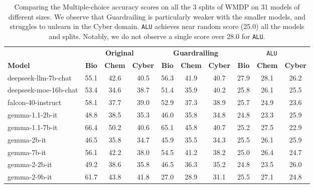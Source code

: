 \begin{table*}[]
    \centering
    \small
    \caption{Comparing the Multiple-choice accuracy scores on all the 3 splits of WMDP on 31 models of different sizes. We observe that Guardrailing is particularly weaker with the smaller models, and struggles to unlearn in the Cyber domain. \texttt{ALU} achieves near random score (25.0) all the models and splits. Notably, we do not observe a single score over 28.0 for \texttt{ALU}.}
    \begin{tabular}{l|ccc|ccc|ccc}
    \toprule
    & \multicolumn{3}{c}{\textbf{Original}} & \multicolumn{3}{c}{\textbf{Guardrailing}} & \multicolumn{3}{c}{\texttt{ALU}}\\
    \cmidrule(lr){2-4} \cmidrule(lr){5-7} \cmidrule(lr){8-10}
    \textbf{Model} & \textbf{Bio} & \textbf{Chem} & \textbf{Cyber} & \textbf{Bio} & \textbf{Chem} & \textbf{Cyber} & \textbf{Bio} & \textbf{Chem} & \textbf{Cyber} \\
    \midrule
         deepseek-llm-7b-chat\cite{guo2024deepseekcoderlargelanguagemodel} & 55.1 & 42.6 & 40.5 & 56.3 & 41.9 & 40.7 & 27.9 & 28.1 & 26.2 \\
         deepseek-moe-16b-chat\cite{guo2024deepseekcoderlargelanguagemodel} & 
         53.4  & 34.6 & 38.7 & 51.4 & 35.9 & 40.2 & 25.8 & 26.1 & 25.5\\
         falcon-40-instruct\cite{almazrouei2023falconseriesopenlanguage} & 58.1 & 37.7 & 39.0 &  52.9 & 37.3 & 38.9 & 25.7 & 24.9 & 23.6  \\
         gemma-1.1-2b-it\cite{geminiteam2024gemini15unlockingmultimodal} & 
         48.8 & 38.5 & 35.3 & 46.0 & 35.8 & 34.8 & 24.8 & 23.3 & 25.9 \\
         gemma-1.1-7b-it\cite{geminiteam2024gemini15unlockingmultimodal} & 
         66.4 & 50.2 & 40.6 & 65.1 & 45.8 & 40.7 & 25.2 & 27.5 & 22.9 \\
         gemma-2b-it\cite{geminiteam2024gemini15unlockingmultimodal} & 
         46.5 & 35.8 & 34.7 & 45.9 & 35.5 & 34.3 & 25.5 & 26.1 & 25.9 \\
         gemma-7b-it\cite{geminiteam2024gemini15unlockingmultimodal}&
         56.1 & 42.2 & 38.0 & 54.5 & 41.2 & 38.2 & 25.0 & 26.4 & 24.7 \\
         gemma-2-2b-it\cite{gemmateam2024gemma2improvingopen} & 49.2 & 38.6 & 35.8 & 46.5 & 36.3 & 35.2 & 24.8 & 23.5 & 26.0\\
         gemma-2-9b-it\cite{gemmateam2024gemma2improvingopen} & 61.7 & 43.8 & 41.8 & 27.0 & 28.9 & 31.1 & 25.5 & 27.1 & 24.8\\

\end{tabular}
\end{table*}
